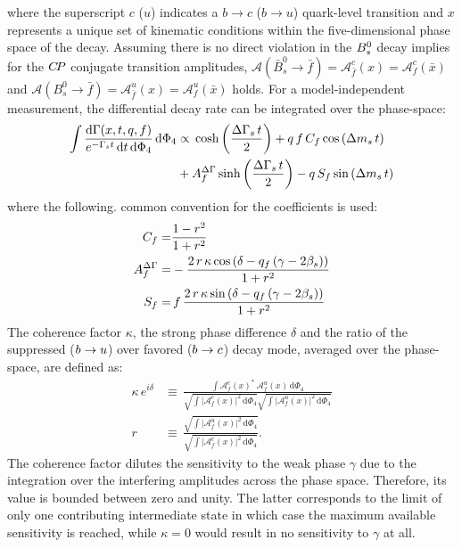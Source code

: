 where the superscript $c$ ($u$) indicates a $b \to c$ ($b\to u$) quark-level transition
and $x$ represents a unique set of kinematic conditions within the five-dimensional phase space of the decay.
Assuming there is no direct \CP violation in the ${{B}^0_{s}}$ decay implies for the ${C\!P}$ conjugate transition amplitudes, 
$\mathcal A(\bar B_s^0 \to \bar f) =  \mathcal A^c_{\bar f}(x) = \mathcal A^c_f(\bar{x})$ and 
$\mathcal A(B_s^0 \to \bar f) = \mathcal A^u_{\bar f}(x)  = \mathcal A^u_{f}(\bar{x})$ holds.\newline
For a model-independent measurement, the differential decay rate can be integrated over the phase-space:
\begin{align}
\label{eq:PDF_intX}
        \nonumber
        \int \frac{\text{d}\Gamma(x,t,q,f)}{e^{- \Gamma_s t} \, \text{d}t \,  \text{d}\Phi_4}  \, \text{d}\Phi_4 &\propto    
        \, \text{cosh} \left( \frac{\Delta \Gamma_s \, t}{2}\right) 
          + q \, f \, C_{f} \, \text{cos} \left( \Delta m_s \, t \right)   \\
         & +  A^{{\Delta\Gamma}}_{f} \, \text{sinh} \left( \frac{\Delta \Gamma_s \, t}{2}\right)  
          - q  \, S_{f}\, \text{sin} \left(\Delta m_s \, t \right)  
\end{align}
where the following. common convention for the \CP coefficients is used:
\begin{align}
\label{eq:CPcoeff}
        C_{f}= & \frac{1-r^2}{1+r^2}   \\
        A^{{\Delta\Gamma}}_{f} = &  -\frac{2 \, r \, \kappa \, \text{cos}\left(\delta-q_f \, (\gamma-2\beta_s)\right)}{1+r^2}   \\
        S_{f} = & \,  f \, \frac{2 \, r \, \kappa \, \text{sin}\left(\delta-q_f \, (\gamma-2\beta_s)\right)}{1+r^2}   
\end{align}
The coherence factor $\kappa$, the strong phase difference $\delta$ and the ratio of the suppressed (${b}\rightarrow{\ensuremath{u}}$) over favored (${b}\rightarrow{\ensuremath{c}}$) decay mode, 
averaged over the phase-space, are defined as:
\begin{align}
\label{eq:coherenceFactor}
        \kappa \, e^{i\delta} &\equiv \, \frac{\int \mathcal A^c_f(x)^{*} \, \mathcal A^u_f(x)  \, \text{d}\Phi_{4}}{\sqrt{\int \vert \mathcal A^c_f(x) \vert^2 \, 
\text{d}\Phi_{4}} \sqrt{\int \vert \mathcal A^u_f(x) \vert^2 \, \text{d}\Phi_{4}}  } \\
        r &\equiv \, \frac{\sqrt{\int \vert \mathcal A^u_f(x)\vert^2 \, \text{d}\Phi_{4} }}{\sqrt{\int \vert \mathcal A^c_f(x)\vert^2 \, \text{d}\Phi_{4}}} .
\end{align}
The coherence factor dilutes the sensitivity to the weak phase $\gamma$ due to the integration over the interfering amplitudes across the phase space.
Therefore, its value is bounded between zero and unity.
The latter corresponds to the limit of only one contributing intermediate state in which case the maximum available sensitivity is reached,
while $\kappa = 0$ would result in no sensitivity to $\gamma$ at all.


